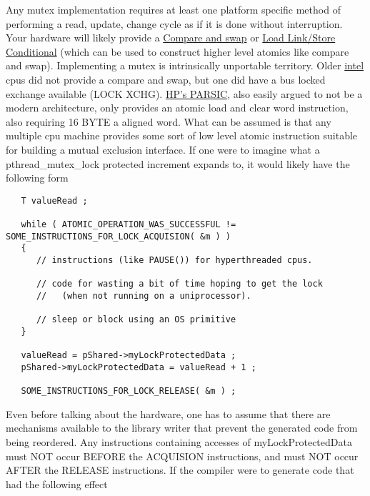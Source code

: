 Any mutex implementation requires at least one platform specific method of performing a read, update, change cycle as if it is done without interruption.  Your hardware will likely provide a \href{http://en.wikipedia.org/wiki/Compare-and-swap}{Compare and swap} or \href{http://en.wikipedia.org/wiki/Load-Link/Store-Conditional}{Load Link/Store Conditional} (which can be used to construct higher level atomics like compare and swap).  Implementing a mutex is intrinsically unportable territory.  Older \href{http://download.intel.com/design/intarch/manuals/24319101.pdf}{intel} cpus did not provide a compare and swap, but one did have a bus locked exchange available (LOCK XCHG).
\href{http://ftp.parisc-linux.org/docs/arch/pa11_acd.pdf}{HP's PARSIC}, also easily argued to not be a modern architecture, only provides an atomic load and clear word instruction, also requiring 16 BYTE a aligned word.  What can be assumed is that any multiple cpu machine provides some sort of low level atomic instruction suitable for building a mutual exclusion interface.  If one were to imagine what a pthread\_mutex\_lock protected increment expands to, it would likely have the following form

\begin{lstlisting}
   T valueRead ;

   while ( ATOMIC_OPERATION_WAS_SUCCESSFUL != SOME_INSTRUCTIONS_FOR_LOCK_ACQUISION( &m ) )
   {
      // instructions (like PAUSE()) for hyperthreaded cpus.

      // code for wasting a bit of time hoping to get the lock
      //   (when not running on a uniprocessor).

      // sleep or block using an OS primitive
   }

   valueRead = pShared->myLockProtectedData ;
   pShared->myLockProtectedData = valueRead + 1 ;

   SOME_INSTRUCTIONS_FOR_LOCK_RELEASE( &m ) ;
\end{lstlisting}

Even before talking about the hardware, one has to assume that there are mechanisms available to the library writer that prevent the generated code from being reordered.  Any instructions containing accesses of myLockProtectedData must NOT occur BEFORE the ACQUISION instructions, and must NOT occur AFTER the RELEASE instructions.  If the compiler were to generate code that had the following effect

